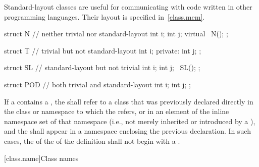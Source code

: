 \pnum
\begin{note} Standard-layout classes are useful for communicating with
code written in other programming languages. Their layout is specified
in~\ref{class.mem}.\end{note}

\pnum
\begin{example}
\begin{codeblock}
struct N {          // neither trivial nor standard-layout
  int i;
  int j;
  virtual ~N();
};

struct T {          // trivial but not standard-layout
  int i;
private:
  int j;
};

struct SL {         // standard-layout but not trivial
  int i;
  int j;
  ~SL();
};

struct POD {        // both trivial and standard-layout
  int i;
  int j;
};
\end{codeblock}
\end{example}

\pnum
If a  contains a ,
the  shall refer to a class that was
previously declared directly in the class or namespace to which the
 refers,
or in an element of the inline namespace set of that namespace
(i.e., not merely inherited or
introduced by a ), and the
 shall appear in a namespace enclosing the
previous declaration.
In such cases, the  of the
 of the
definition shall not begin with a .

[class.name]{Class names}
%
%
%


